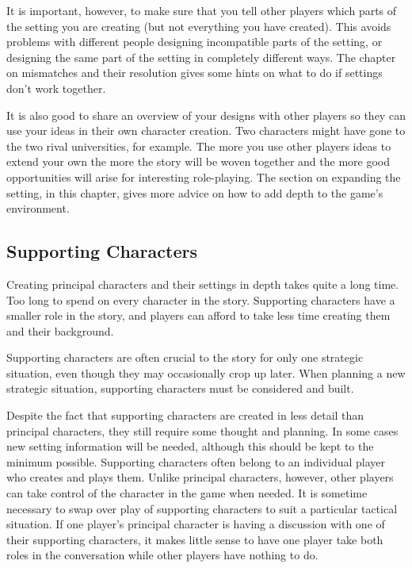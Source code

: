 \documentclass[twoside]{book}
\begin{document}
It is important, however, to make sure that you tell other players
which parts of the setting you are creating (but not everything you
have created). This avoids problems with different people designing
incompatible parts of the setting, or designing the same part of the
setting in completely different ways. The chapter on mismatches and
their resolution gives some hints on what to do if settings don't work
together.

It is also good to share an overview of your designs with other
players so they can use your ideas in their own character
creation. Two characters might have gone to the two rival
universities, for example. The more you use other players ideas to
extend your own the more the story will be woven together and the more
good opportunities will arise for interesting role-playing. The
section on expanding the setting, in this chapter, gives more advice
on how to add depth to the game's environment.

\subsection{Supporting Characters}

Creating principal characters and their settings in depth takes quite
a long time. Too long to spend on every character in the
story. Supporting characters have a smaller role in the story, and
players can afford to take less time creating them and their
background.

Supporting characters are often crucial to the story for only one
strategic situation, even though they may occasionally crop up
later. When planning a new strategic situation, supporting characters
must be considered and built.

Despite the fact that supporting characters are created in less detail
than principal characters, they still require some thought and
planning. In some cases new setting information will be needed,
although this should be kept to the minimum possible. Supporting
characters often belong to an individual player who creates and plays
them. Unlike principal characters, however, other players can take
control of the character in the game when needed. It is sometime
necessary to swap over play of supporting characters to suit a
particular tactical situation. If one player's principal character is
having a discussion with one of their supporting characters, it makes
little sense to have one player take both roles in the conversation
while other players have nothing to do.
\end{document}

